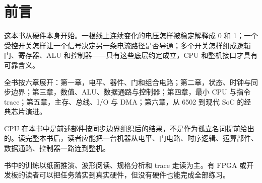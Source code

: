 \chapter*{前言}

这本书从硬件本身开始。一根线上连续变化的电压怎样被稳定解释成 0 和 1；一个受控开关怎样让一个信号决定另一条电流路径是否导通；多个开关怎样组成逻辑门、寄存器、ALU 和控制器——只有这些底层约定成立，CPU 和整机接口才具有可靠含义。

全书按六章展开：第一章，电平、器件、门和组合电路；第二章，状态、时钟与同步边界；第三章，数值、ALU、数据通路与控制器；第四章，最小 CPU 与指令 trace；第五章，主存、总线、I/O 与 DMA；第六章，从 6502 到现代 SoC 的经典芯片演进。

CPU 在本书中是前述部件按同步边界组织后的结果，不是作为孤立名词提前给出的。读完整本书后，读者应能把一台机器从电平、门电路、时序逻辑、运算部件、数据通路、控制器一路连到整机。

书中的训练以纸面推演、波形阅读、规格分析和 trace 走读为主。有 FPGA 或开发板的读者可以把任务落实到真实硬件，但没有硬件也能完成全部练习。
